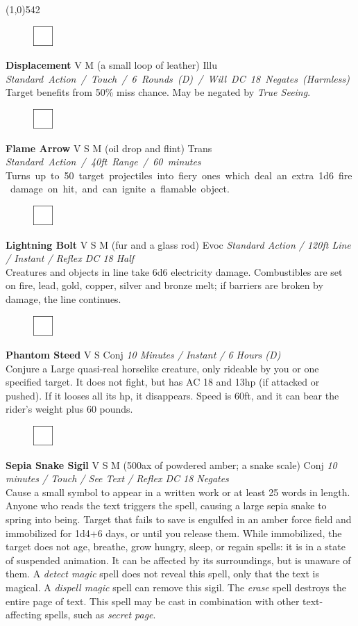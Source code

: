 \documentclass[letterpaper]{article}
\newcommand{\fullline}{\noindent\line(1,0){542} \\}
\newcommand{\spell}[7]{
\begin{figure}
\vspace{-13pt}
\ifstrequal{#2}{Full}{  \includegraphics[width=2em]{Checkbox-Full}}{
\ifstrequal{#2}{Scroll}{\includegraphics[width=2em]{Checkbox-S}}{
                        \includegraphics[width=2em]{Checkbox}}}
\ifstrequal{#7}{}{\vspace{-1em}}{\vspace{#7}}
\end{figure}
\noindent \textbf{#1} #3 {
    \ifstrequal{#4}{Conj}{\color{Plum}Conj}{%
    \ifstrequal{#4}{Divin}{\color{YellowOrange}Divin}{%
    \ifstrequal{#4}{Ench}{\color{VioletRed}Ench}{%
    \ifstrequal{#4}{Trans}{\color{LimeGreen}Trans}{%
    \ifstrequal{#4}{Evoc}{\color{RedOrange}Evoc}{%
    \ifstrequal{#4}{Illu}{\color{ProcessBlue}Illu}{%
    \ifstrequal{#4}{Abjur}{\color{CadetBlue}Abjur}{%
    \ifstrequal{#4}{Necro}{\color{Red}Necro}{%
}}}}}}}}}
{\footnotesize \emph{#5}} \\
#6
}
\begin{document}
\fullline
\vspace{-1.25em}

\spell{Displacement}{}{V M (a small loop of leather)}{Illu}{\mbox{Standard Action / Touch / 6 Rounds (D) / Will DC 18 Negates (Harmless)}}{%
Target benefits from 50\% miss chance. May be negated by \emph{True Seeing}.}{}\\[-1em] %

\spell{Flame Arrow}{}{V S M (oil drop and flint)}{Trans}{\mbox{Standard Action / 40ft Range / 60 minutes}}{%
\mbox{Turns up to 50 target projectiles into fiery ones which deal an extra 1d6 fire damage on hit, and can ignite a flamable object.}}{}\\[-1em] %

\spell{Lightning Bolt}{}{V S M (fur and a glass rod)}{Evoc}{Standard Action / 120ft Line / Instant / Reflex DC 18 Half}{%
Creatures and objects in line take 6d6 electricity damage. Combustibles are set on fire, lead, gold, copper, silver and bronze melt; if barriers are broken by damage, the line continues.}{} %

\spell{Phantom Steed}{}{V S}{Conj}{10 Minutes / Instant / 6 Hours (D)}{%
Conjure a Large quasi-real horselike creature, only rideable by you or one specified target. It does not fight, but has AC 18 and 13hp (if attacked or pushed).  If it looses all its hp, it disappears.  Speed is 60ft, and it can bear the rider's weight plus 60 pounds.}{1em}\\[-1em] %

\spell{Sepia Snake Sigil}{}{V S M (500ax of powdered amber; a snake scale)}{Conj}{\emph{10 minutes / Touch / See Text / Reflex DC 18 Negates}}{%
Cause a small symbol to appear in a written work or at least 25 words in length.  Anyone who reads the text triggers the spell, causing a large sepia snake to spring into being.  Target that fails to save is engulfed in an amber force field and immobilized for 1d4+6 days, or until you release them.  While immobilized, the target does not age, breathe, grow hungry, sleep, or regain spells: it is in a state of suspended animation.  It can be affected by its surroundings, but is unaware of them.  A \emph{detect magic} spell does not reveal this spell, only that the text is magical.  A \emph{dispell magic} spell can remove this sigil.  The \emph{erase} spell destroys the entire page of text.  This spell may be cast in combination with other text-affecting spells, such as \emph{secret page}.}{5em}\\[-1em] %
\end{document}
